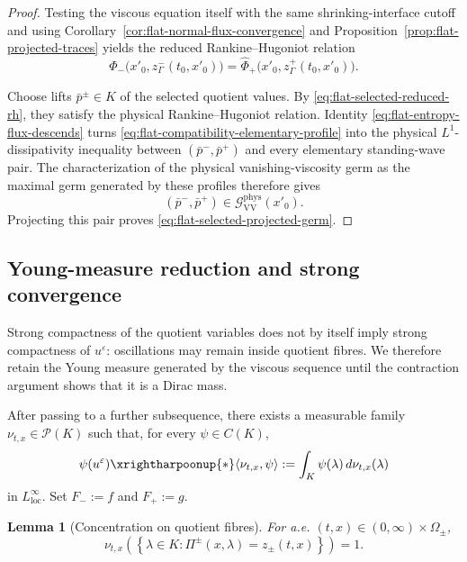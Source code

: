 \documentclass[11pt]{amsart}
\numberwithin{equation}{section}
\theoremstyle{plain}
\newtheorem{lemma}[theorem]{Lemma}
\theoremstyle{definition}
\theoremstyle{remark}
\begin{document}
\begin{proof}
Testing the viscous equation itself with the same shrinking-interface cutoff
and using Corollary~\ref{cor:flat-normal-flux-convergence} and
Proposition~\ref{prop:flat-projected-traces} yields the reduced
Rankine--Hugoniot relation
\begin{equation}
\label{eq:flat-selected-reduced-rh}
    \widehat\Phi_-
    \bigl(x'_0,z^-_\Gamma(t_0,x'_0)\bigr)
    =
    \widehat\Phi_+
    \bigl(x'_0,z^+_\Gamma(t_0,x'_0)\bigr).
\end{equation}

Choose lifts \(\bar p^\pm\in K\) of the selected quotient values. By
\eqref{eq:flat-selected-reduced-rh}, they satisfy the physical
Rankine--Hugoniot relation. Identity
\eqref{eq:flat-entropy-flux-descends} turns
\eqref{eq:flat-compatibility-elementary-profile} into the physical
\(L^1\)-dissipativity inequality between \((\bar p^-,\bar p^+)\) and every
elementary standing-wave pair. The characterization of the physical
vanishing-viscosity germ as the maximal germ generated by these profiles
therefore gives
\[
    (\bar p^-,\bar p^+)
    \in
    \mathcal G_{\mathrm{VV}}^{\mathrm{phys}}(x'_0).
\]
Projecting this pair proves
\eqref{eq:flat-selected-projected-germ}.
\end{proof}

\subsection{Young-measure reduction and strong convergence}
\label{subsec:flat-young-measure}

Strong compactness of the quotient variables does not by itself imply strong
compactness of \(u^\varepsilon\): oscillations may remain inside quotient
fibres. We therefore retain the Young measure generated by the viscous
sequence until the contraction argument shows that it is a Dirac mass.

After passing to a further subsequence, there exists a measurable family
\(\nu_{t,x}\in\mathcal P(K)\) such that, for every \(\psi\in C(K)\),
\begin{equation}
\label{eq:flat-young-measure-generation}
    \psi(u^\varepsilon)
    \xrightharpoonup{\ast}
    \langle\nu_{t,x},\psi\rangle
    :=
    \int_K\psi(\lambda)\,d\nu_{t,x}(\lambda)
\end{equation}
in \(L^\infty_{\mathrm{loc}}\). Set \(F_-:=f\) and \(F_+:=g\).

\begin{lemma}[Concentration on quotient fibres]
\label{lem:flat-young-concentration}
For a.e. \((t,x)\in(0,\infty)\times\Omega_\pm\),
\begin{equation}
\label{eq:flat-young-concentration}
    \nu_{t,x}
    \left(
        \left\{
            \lambda\in K:
            \Pi^\pm(x,\lambda)=z_\pm(t,x)
        \right\}
    \right)
    =1.
\end{equation}
\end{lemma}
\end{document}
